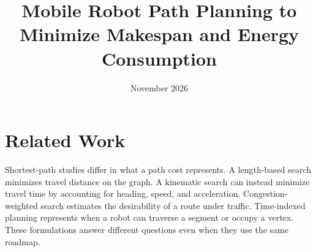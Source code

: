 \documentclass[11pt]{article}
\title{Mobile Robot Path Planning to Minimize Makespan and Energy Consumption}
\author{}
\date{November 2026}
\begin{document}
\maketitle

\section{Related Work}

Shortest-path studies differ in what a path cost represents. A length-based
search minimizes travel distance on the graph. A kinematic search can instead
minimize travel time by accounting for heading, speed, and acceleration.
Congestion-weighted search estimates the desirability of a route under traffic.
Time-indexed planning represents when a robot can traverse a segment or occupy
a vertex. These formulations answer different questions even when they use
the same roadmap.
\end{document}
